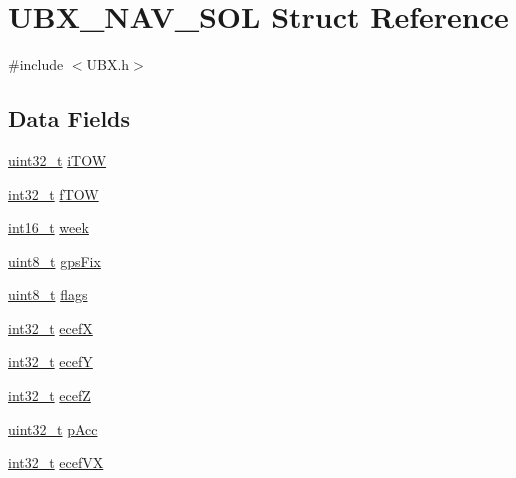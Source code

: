 \hypertarget{struct_u_b_x___n_a_v___s_o_l}{\section{U\-B\-X\-\_\-\-N\-A\-V\-\_\-\-S\-O\-L Struct Reference}
\label{struct_u_b_x___n_a_v___s_o_l}
}


{\ttfamily \#include $<$U\-B\-X.\-h$>$}

\subsection*{Data Fields}
\begin{DoxyCompactItemize}
\item 
\hyperlink{stdint_8h_a435d1572bf3f880d55459d9805097f62}{uint32\-\_\-t} \hyperlink{group___g_s_p_module_ga22a48bcb2972bbd63bf5b5c0a29b8713}{i\-T\-O\-W}
\item 
\hyperlink{group___n_a_m_e_gafd12020da5a235dfcf0c3c748fb5baed}{int32\-\_\-t} \hyperlink{group___g_s_p_module_ga7e73f1e4919dbde57008c9f9fad153cf}{f\-T\-O\-W}
\item 
\hyperlink{stdint_8h_aa343fa3b3d06292b959ffdd4c4703b06}{int16\-\_\-t} \hyperlink{group___g_s_p_module_gaceeb9bd043b85b904f3a3bcfd1c2dc38}{week}
\item 
\hyperlink{stdint_8h_aba7bc1797add20fe3efdf37ced1182c5}{uint8\-\_\-t} \hyperlink{group___g_s_p_module_gae821898e9ca043790d8f58da75355f38}{gps\-Fix}
\item 
\hyperlink{stdint_8h_aba7bc1797add20fe3efdf37ced1182c5}{uint8\-\_\-t} \hyperlink{group___g_s_p_module_ga25c7a16be058569db8ae95b89abf3b42}{flags}
\item 
\hyperlink{group___n_a_m_e_gafd12020da5a235dfcf0c3c748fb5baed}{int32\-\_\-t} \hyperlink{group___g_s_p_module_ga9c671f98502c60d7997cccc3460e8879}{ecef\-X}
\item 
\hyperlink{group___n_a_m_e_gafd12020da5a235dfcf0c3c748fb5baed}{int32\-\_\-t} \hyperlink{group___g_s_p_module_gaec3dced166e4dcaa0826b1e851532604}{ecef\-Y}
\item 
\hyperlink{group___n_a_m_e_gafd12020da5a235dfcf0c3c748fb5baed}{int32\-\_\-t} \hyperlink{group___g_s_p_module_gaf7e4df25c5986355c90a1a519b39b50d}{ecef\-Z}
\item 
\hyperlink{stdint_8h_a435d1572bf3f880d55459d9805097f62}{uint32\-\_\-t} \hyperlink{group___g_s_p_module_gaf472e94738185b263cbfb4bffcca13ff}{p\-Acc}
\item 
\hyperlink{group___n_a_m_e_gafd12020da5a235dfcf0c3c748fb5baed}{int32\-\_\-t} \hyperlink{group___g_s_p_module_gaafca9f9204a38e9bb1646848cafcfb38}{ecef\-V\-X}

\end{DoxyCompactItemize}
